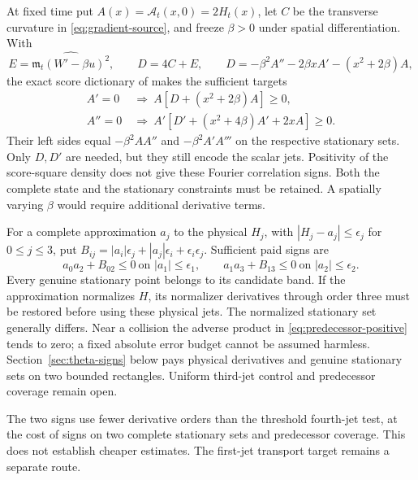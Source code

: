 \documentclass[11pt]{article}
\theoremstyle{definition}
\theoremstyle{remark}
\begin{document}
At fixed time put $A(x)=\mathcal A_t(x,0)=2H_t(x)$, let $C$ be the
transverse curvature in \eqref{eq:gradient-source}, and freeze $\beta>0$
under spatial differentiation. With
\begin{equation}
 E=\widehat{\mathfrak m_t(W'-\beta u)^2},\qquad D=4C+E,
 \qquad
 D=-\beta^2A''-2\beta xA'-(x^2+2\beta)A,
 \label{eq:stationary-score}
\end{equation}
the exact score dictionary of \cite{heat25} makes the sufficient targets
\begin{align}
 A'=0&\ \Longrightarrow\
 A[D+(x^2+2\beta)A]\ge0,\label{eq:stationary-target-zero}\\
 A''=0&\ \Longrightarrow\
 A'[D'+(x^2+4\beta)A'+2xA]\ge0.\label{eq:stationary-target-one}
\end{align}
Their left sides equal $-\beta^2AA''$ and $-\beta^2A'A'''$ on the
respective stationary sets. Only $D,D'$ are needed, but they still encode
the scalar jets. Positivity of the score-square density does not give
these Fourier correlation signs. Both the complete state and the
stationary constraints must be retained. A spatially varying $\beta$
would require additional derivative terms.

For a complete approximation $a_j$ to the physical $H_j$, with
$|H_j-a_j|\le\epsilon_j$ for $0\le j\le3$, put
$B_{ij}=|a_i|\epsilon_j+|a_j|\epsilon_i+\epsilon_i\epsilon_j$.
Sufficient paid signs are
\begin{equation}
 a_0a_2+B_{02}\le0\ \text{on }|a_1|\le\epsilon_1,
 \qquad
 a_1a_3+B_{13}\le0\ \text{on }|a_2|\le\epsilon_2.
 \label{eq:stationary-paid}
\end{equation}
Every genuine stationary point belongs to its candidate band. If the
approximation normalizes $H$, its normalizer derivatives through order
three must be restored before using these physical jets. The normalized
stationary set generally differs. Near a collision the adverse product
in \eqref{eq:predecessor-positive} tends to zero; a fixed absolute error
budget cannot be assumed harmless. Section~\ref{sec:theta-signs}
below pays physical derivatives and genuine stationary sets on two
bounded rectangles. Uniform third-jet control and predecessor
coverage remain open.

The two signs use fewer derivative orders than the threshold fourth-jet
test, at the cost of signs on two complete stationary sets and predecessor
coverage. This does not establish cheaper estimates. The first-jet
transport target remains a separate route.
\end{document}
